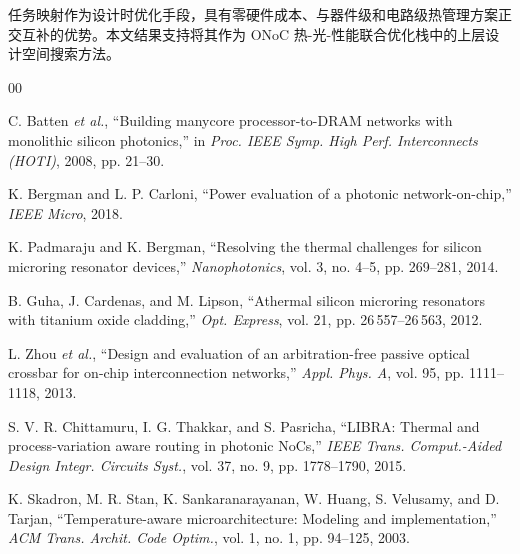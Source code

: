 \documentclass[conference]{IEEEtran}
\begin{document}
任务映射作为设计时优化手段，具有零硬件成本、与器件级和电路级热管理方案正交互补的优势。本文结果支持将其作为 ONoC 热-光-性能联合优化栈中的上层设计空间搜索方法。

\begin{thebibliography}{00}

C. Batten \emph{et al.},
``Building manycore processor-to-DRAM networks with monolithic silicon photonics,''
in \emph{Proc. IEEE Symp. High Perf. Interconnects (HOTI)}, 2008, pp. 21--30.

K. Bergman and L. P. Carloni,
``Power evaluation of a photonic network-on-chip,''
\emph{IEEE Micro}, 2018.

K. Padmaraju and K. Bergman,
``Resolving the thermal challenges for silicon microring resonator devices,''
\emph{Nanophotonics}, vol. 3, no. 4--5, pp. 269--281, 2014.

B. Guha, J. Cardenas, and M. Lipson,
``Athermal silicon microring resonators with titanium oxide cladding,''
\emph{Opt. Express}, vol. 21, pp. 26\,557--26\,563, 2012.

L. Zhou \emph{et al.},
``Design and evaluation of an arbitration-free passive optical crossbar for on-chip interconnection networks,''
\emph{Appl. Phys. A}, vol. 95, pp. 1111--1118, 2013.

S. V. R. Chittamuru, I. G. Thakkar, and S. Pasricha,
``LIBRA: Thermal and process-variation aware routing in photonic NoCs,''
\emph{IEEE Trans. Comput.-Aided Design Integr. Circuits Syst.}, vol. 37, no. 9, pp. 1778--1790, 2015.

K. Skadron, M. R. Stan, K. Sankaranarayanan, W. Huang, S. Velusamy, and D. Tarjan,
``Temperature-aware microarchitecture: Modeling and implementation,''
\emph{ACM Trans. Archit. Code Optim.}, vol. 1, no. 1, pp. 94--125, 2003.

\end{thebibliography}
\end{document}
